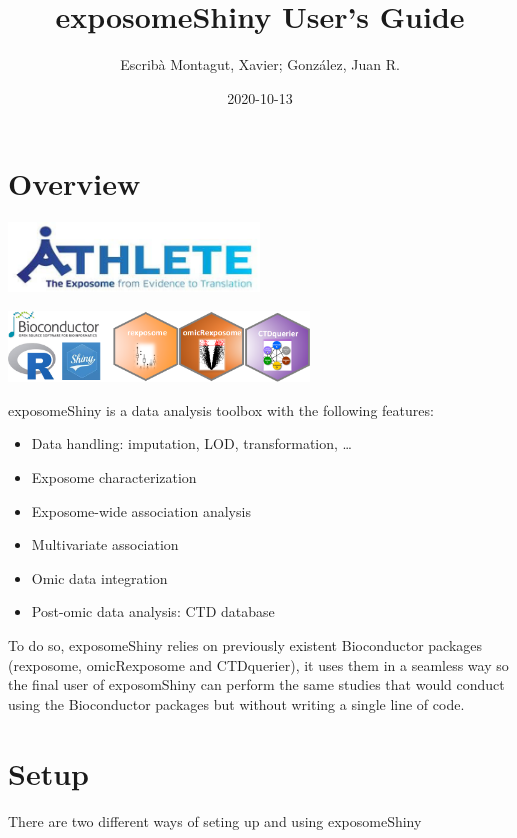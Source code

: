 \documentclass[
]{book}
\title{exposomeShiny User's Guide}
\author{Escribà Montagut, Xavier; González, Juan R.}
\date{2020-10-13}
\providecommand{\tightlist}{%
  \setlength{\itemsep}{0pt}\setlength{\parskip}{0pt}}
\begin{document}
\maketitle

{
\setcounter{tocdepth}{1}
\tableofcontents
}
\hypertarget{overview}{%
\chapter{Overview}\label{overview}}

\includegraphics[width=0.5\textwidth,height=\textheight]{images/athlete.png}

\includegraphics[width=0.6\textwidth,height=\textheight]{images/logo.png}

exposomeShiny is a data analysis toolbox with the following features:

\begin{itemize}
\tightlist
\item
  Data handling: imputation, LOD, transformation, \ldots{}
\item
  Exposome characterization
\item
  Exposome-wide association analysis
\item
  Multivariate association
\item
  Omic data integration
\item
  Post-omic data analysis: CTD database
\end{itemize}

To do so, exposomeShiny relies on previously existent Bioconductor packages (rexposome, omicRexposome and CTDquerier), it uses them in a seamless way so the final user of exposomShiny can perform the same studies that would conduct using the Bioconductor packages but without writing a single line of code.

\hypertarget{setup}{%
\chapter{Setup}\label{setup}}

There are two different ways of seting up and using exposomeShiny
\end{document}
